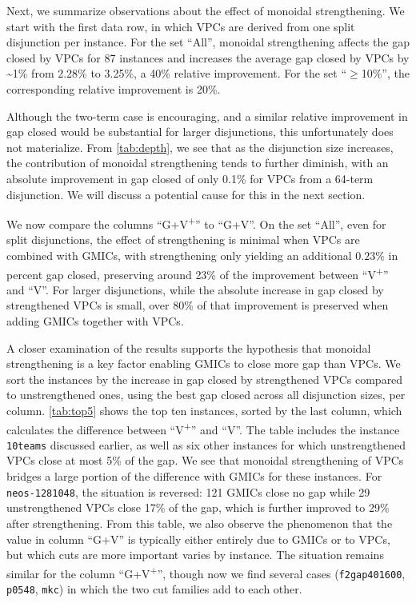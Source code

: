 \documentclass[oribibl,envcountsame]{llncs}
\theoremstyle{remark}
\theoremstyle{definition}
\newcommand{\goodVPCSet}{$\ge$10\%}
\newcommand{\instance}[1]{\texttt{#1}}
\begin{document}
Next, we summarize observations about the effect of monoidal strengthening.
We start with the first data row, in which VPCs are derived from one split disjunction per instance.
For the set ``All'', monoidal strengthening affects the gap closed by VPCs for 87 instances and increases the average gap closed by VPCs by \textasciitilde 1\% from 2.28\% to 3.25\%, a 40\% relative improvement.
For the set ``\goodVPCSet'', the corresponding relative improvement is 20\%.

Although the two-term case is encouraging, and a similar relative improvement in gap closed would be substantial for larger disjunctions, 
this unfortunately does not materialize.
From \cref{tab:depth}, we see that as the disjunction size increases, the contribution of monoidal strengthening tends to further diminish, with an absolute improvement in gap closed of only 0.1\% for VPCs from a 64-term disjunction.
We will discuss a potential cause for this in the next section.

We now compare the columns ``G+V\textsuperscript{+}'' to ``G+V''.
On the set ``All'', even for split disjunctions, the effect of strengthening is minimal when VPCs are combined with GMICs, with strengthening only yielding an additional $0.23\%$ in percent gap closed, preserving around 23\% of the improvement between ``V\textsuperscript{+}'' and ``V''.
For larger disjunctions, while the absolute increase in gap closed by strengthened VPCs is small,
over 80\% of that improvement is preserved when adding GMICs together with VPCs.





A closer examination of the results supports the hypothesis
that monoidal strengthening is a key factor enabling GMICs to close more gap than VPCs.
We sort the instances by the increase in gap closed by strengthened VPCs compared to unstrengthened ones, using the best gap closed across all disjunction sizes, per column.
\cref{tab:top5} shows the top ten instances, sorted by the last column, which calculates the difference between ``V\textsuperscript{+}'' and ``V''.
The table includes the instance \instance{10teams} discussed earlier, as well as six other instances for which unstrengthened VPCs close at most 5\% of the gap.
We see that monoidal strengthening of VPCs bridges a large portion of the difference with GMICs for these instances.
For \instance{neos-1281048}, the situation is reversed: 121 GMICs close no gap while 29 unstrengthened VPCs close 17\% of the gap, which is further improved to 29\% after strengthening.
From this table, we also observe the phenomenon that the value in column ``G+V'' is typically either entirely due to GMICs or to VPCs, but which cuts are more important varies by instance.
The situation remains similar for the column ``G+V\textsuperscript{+}'', though now we find several cases (\instance{f2gap401600}, \instance{p0548}, \instance{mkc}) in which the two cut families add to each other.
\end{document}
